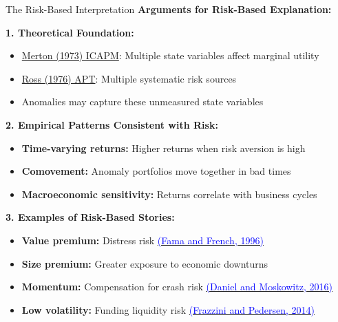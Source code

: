 \documentclass{beamer}
\begin{document}
\begin{frame}{The Risk-Based Interpretation}
    \textbf{Arguments for Risk-Based Explanation:}
    
    \vspace{0.2cm}
    \textbf{1. Theoretical Foundation:}
    \begin{itemize}
        \item \textcolor{blue}{\href{https://doi.org/10.2307/1913811}{Merton (1973) ICAPM}}: Multiple state variables affect marginal utility
        \item \textcolor{blue}{\href{https://doi.org/10.1142/9789814417358_0001}{Ross (1976) APT}}: Multiple systematic risk sources
        \item Anomalies may capture these unmeasured state variables
    \end{itemize}
    
    \vspace{0.3cm}
    \textbf{2. Empirical Patterns Consistent with Risk:}
    \begin{itemize}
        \item \textbf{Time-varying returns:} Higher returns when risk aversion is high
        \item \textbf{Comovement:} Anomaly portfolios move together in bad times
        \item \textbf{Macroeconomic sensitivity:} Returns correlate with business cycles
    \end{itemize}
    
    \vspace{0.3cm}
    \textbf{3. Examples of Risk-Based Stories:}
    \begin{itemize}
        \item \textbf{Value premium:} Distress risk \href{https://doi.org/10.1111/j.1540-6261.1996.tb05202.x}{\textcolor{blue}{(Fama and French, 1996)}}
        \item \textbf{Size premium:} Greater exposure to economic downturns
        \item \textbf{Momentum:} Compensation for crash risk \href{https://doi.org/10.1016/j.jfineco.2015.12.002}{\textcolor{blue}{(Daniel and Moskowitz, 2016)}} 
        \item \textbf{Low volatility:} Funding liquidity risk \href{https://doi.org/10.1016/j.jfineco.2013.10.005}{\textcolor{blue}{(Frazzini and Pedersen, 2014)}} 
    \end{itemize}
\end{frame}
\end{document}

